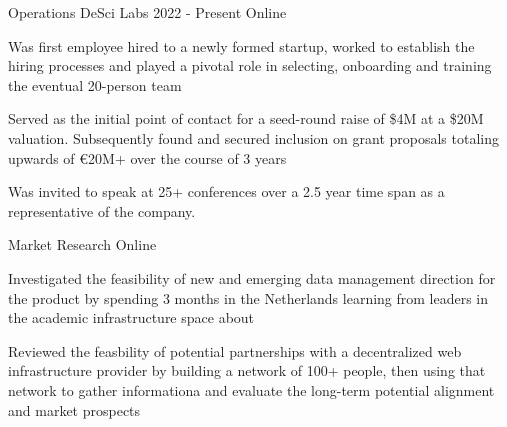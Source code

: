 
\begin{cventries}

  \cventry
    {Operations} %
    {DeSci Labs} %
    {2022 - Present} %
    {Online} %
    {
      \begin{cvitems} %
        \item {Was first employee hired to a newly formed startup, worked to establish the hiring processes and played a pivotal role in selecting, onboarding and training the eventual 20-person team}
        \item {Served as the initial point of contact for a seed-round raise of \$4M at a \$20M valuation. Subsequently found and secured inclusion on grant proposals totaling upwards of €20M+ over the course of 3 years}
        \item {Was invited to speak at 25+ conferences over a 2.5 year time span as a representative of the company.}
      \end{cvitems}
    }

  \cventry
    {Market Research} %
    {} %
    {} %
    {Online} %
    {
      \begin{cvitems} %
        \item {Investigated the feasibility of new and emerging data management direction for the product by spending 3 months in the Netherlands learning from leaders in the academic infrastructure space about}
        \item {Reviewed the feasbility of potential partnerships with a decentralized web infrastructure provider by building a network of 100+ people, then using that network to gather informationa and evaluate the long-term potential alignment and market prospects}
      \end{cvitems}
    }
    

\end{cventries}
